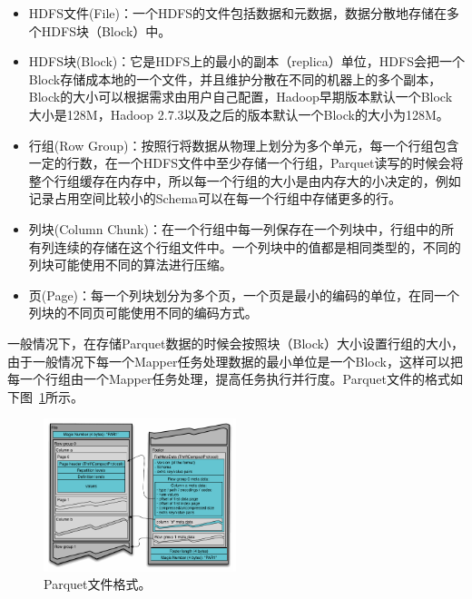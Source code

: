 \begin{itemize}
    \item HDFS文件(File)：一个HDFS的文件包括数据和元数据，数据分散地存储在多个HDFS块（Block）中。

    \item HDFS块(Block)：它是HDFS上的最小的副本（replica）单位，HDFS会把一个Block存储成本地的一个文件，并且维护分散在不同的机器上的多个副本，Block的大小可以根据需求由用户自己配置，Hadoop早期版本默认一个Block大小是128M，Hadoop 2.7.3以及之后的版本默认一个Block的大小为128M。
    
    \item 行组(Row Group)：按照行将数据从物理上划分为多个单元，每一个行组包含一定的行数，在一个HDFS文件中至少存储一个行组，Parquet读写的时候会将整个行组缓存在内存中，所以每一个行组的大小是由内存大的小决定的，例如记录占用空间比较小的Schema可以在每一个行组中存储更多的行。

    \item 列块(Column Chunk)：在一个行组中每一列保存在一个列块中，行组中的所有列连续的存储在这个行组文件中。一个列块中的值都是相同类型的，不同的列块可能使用不同的算法进行压缩。

    \item 页(Page)：每一个列块划分为多个页，一个页是最小的编码的单位，在同一个列块的不同页可能使用不同的编码方式。
\end{itemize}

\par 一般情况下，在存储Parquet数据的时候会按照块（Block）大小设置行组的大小，由于一般情况下每一个Mapper任务处理数据的最小单位是一个Block，这样可以把每一个行组由一个Mapper任务处理，提高任务执行并行度。Parquet文件的格式如下图~\ref{fig:parquet-file-layout}所示。


\begin{figure}[]
	\centering
	\includegraphics[width=0.5\textwidth]{img/simple-solution/FileLayout}
	
	\caption{Parquet文件格式。}
	\label{fig:parquet-file-layout}
\end{figure}

